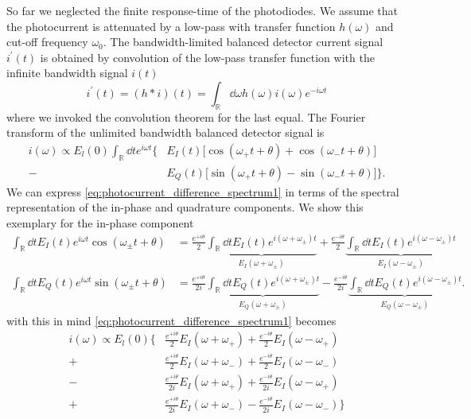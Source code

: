 So far we neglected the finite response-time of the photodiodes.
We assume that the photocurrent is attenuated by a low-pass with transfer function $h(\omega)$ and cut-off frequency $\omega_0$.
The bandwidth-limited balanced detector current signal $i^\prime(t)$ is obtained by convolution of the low-pass transfer function with the infinite bandwidth signal $i(t)$
\begin{equation}
    i^\prime(t)
    =
    (h*i)(t)
    =
    \int_\mathbb{R}\dd{\omega} h(\omega)i(\omega)e^{-i\omega t}
    \label{eq:photocurrent_difference_bandwidth_limited}
\end{equation}
where we invoked the convolution theorem for the last equal.
The Fourier transform of the unlimited bandwidth balanced detector signal is
\begin{align}
    i(\omega)
    \propto
    E_l(0)\int_\mathbb{R}\dd{t}e^{i\omega t}
    \biggl\{
        &E_I(t)\bigl[\cos(\omega_+t+\theta)+\cos(\omega_-t+\theta)\bigr]\\
       -&E_Q(t)\bigl[\sin(\omega_+t+\theta)-\sin(\omega_-t+\theta)\bigr]
    \biggr\}
    \label{eq:photocurrent_difference_spectrum1}.
\end{align}
We can express \cref{eq:photocurrent_difference_spectrum1} in terms of the spectral representation of the in-phase and quadrature components.
We show this exemplary for the in-phase component
\begin{align*}
    \int_\mathbb{R}\dd{t}E_I(t)e^{i\omega t}\cos(\omega_\pm t+\theta)
    &=
    \frac{e^{+i\theta}}{2}\underbrace{\int_\mathbb{R}\dd{t}E_I(t)e^{i(\omega+\omega_\pm)t}}_{E_I(\omega+\omega_\pm)}
    +
    \frac{e^{-i\theta}}{2}\underbrace{\int_\mathbb{R}\dd{t}E_I(t)e^{i(\omega-\omega_\pm)t}}_{E_I(\omega-\omega_\pm)}\\
    \int_\mathbb{R}\dd{t}E_Q(t)e^{i\omega t}\sin(\omega_\pm t+\theta)
    &=
    \frac{e^{+i\theta}}{2i}\underbrace{\int_\mathbb{R}\dd{t}E_Q(t)e^{i(\omega+\omega_\pm)t}}_{E_Q(\omega+\omega_\pm)}
    -
    \frac{e^{-i\theta}}{2i}\underbrace{\int_\mathbb{R}\dd{t}E_Q(t)e^{i(\omega-\omega_\pm)t}}_{E_Q(\omega-\omega_\pm)}
    .
\end{align*}
with this in mind \cref{eq:photocurrent_difference_spectrum1} becomes
\begin{align*}
    i(\omega)
    \propto
    E_l(0)
    \biggl\{
        &\frac{e^{+i\theta}}{2}E_I(\omega+\omega_+)+\frac{e^{-i\theta}}{2}E_I(\omega-\omega_+)\\
        +&\frac{e^{+i\theta}}{2}E_I(\omega+\omega_-)+\frac{e^{-i\theta}}{2}E_I(\omega-\omega_-)\\
        -&\frac{e^{+i\theta}}{2i}E_I(\omega+\omega_+)+\frac{e^{-i\theta}}{2i}E_I(\omega-\omega_+)\\
        +&\frac{e^{+i\theta}}{2i}E_I(\omega+\omega_-)-\frac{e^{-i\theta}}{2i}E_I(\omega-\omega_-)
    \biggr\}
\end{align*}
